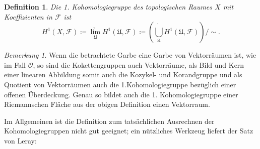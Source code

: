 \documentclass[11pt,a4paper]{scrartcl}
\theoremstyle{thm}
\theoremstyle{def}
\newtheorem{defi}{Definition}[section]
\theoremstyle{remark}
\newtheorem*{bem}{Bemerkung}
\begin{document}
\begin{defi}
Die \emph{1. Kohomologiegruppe} des topologischen Raumes $X$ mit Koeffizienten in $\mathcal{F}$ ist
$$
H^1(X,\mathcal{F}) \coloneqq \underset{\mathfrak{U}}{\underrightarrow{\lim}} H^1(\mathfrak{U},\mathcal{F})\coloneqq \left( \dot{\bigcup_{\mathfrak{U}}} H^1(\mathfrak{U},\mathcal{F})\right) /\sim.
$$
\end{defi}
\begin{bem}
Wenn die betrachtete Garbe eine Garbe von Vektorräumen ist, wie im Fall $\mathcal{O}$, so sind die Kokettengruppen auch Vektorräume, als Bild und Kern einer linearen Abbildung somit auch die Kozykel- und Korandgruppe und als Quotient von Vektorräumen auch die 1.Kohomologiegruppe bezüglich einer offenen Überdeckung. Genau so bildet auch die 1. Kohomologiegruppe einer Riemannschen Fläche aus der obigen Definition einen Vektorraum.
\end{bem}
Im Allgemeinen ist die Definition zum tatsächlichen Ausrechnen der Kohomologiegruppen nicht gut geeignet; ein nützliches Werkzeug liefert der Satz von Leray:
\end{document}
